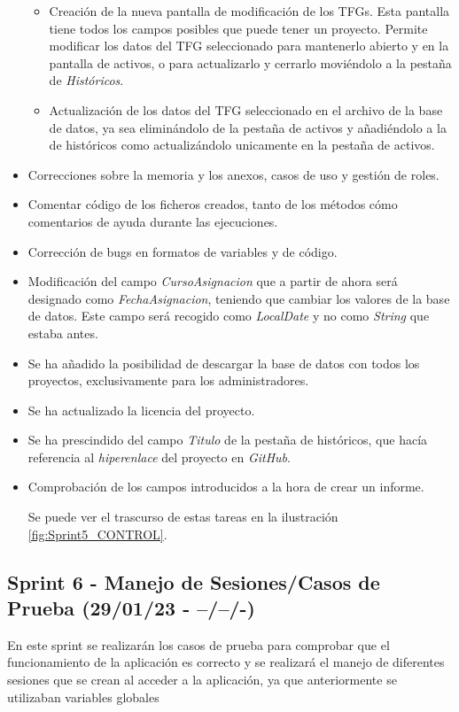 \begin{itemize}
\begin{itemize}
		\item Creación de la nueva pantalla de modificación de los TFGs. Esta pantalla tiene todos los campos posibles que puede tener un proyecto. Permite modificar los datos del TFG seleccionado para mantenerlo abierto y en la pantalla de activos, o para actualizarlo y cerrarlo moviéndolo a la pestaña de \emph{Históricos}.
		\item Actualización de los datos del TFG seleccionado en el archivo de la base de datos, ya sea eliminándolo de la pestaña de activos y añadiéndolo a la de históricos como actualizándolo unicamente en la pestaña de activos.
	\end{itemize}
	\item Correcciones sobre la memoria y los anexos, casos de uso y gestión de roles.
	\item Comentar código de los ficheros creados, tanto de los métodos cómo comentarios de ayuda durante las ejecuciones.
	\item Corrección de bugs en formatos de variables y de código.
	\item Modificación del campo \emph{CursoAsignacion} que a partir de ahora será designado como \emph{FechaAsignacion}, teniendo que cambiar los valores de la base de datos. Este campo será recogido como \emph{LocalDate} y no como \emph{String} que estaba antes.
	\item Se ha añadido la posibilidad de descargar la base de datos con todos los proyectos, exclusivamente para los administradores.
	\item Se ha actualizado la licencia del proyecto.
	\item Se ha prescindido del campo \emph{Titulo} de la pestaña de históricos, que hacía referencia al \emph{hiperenlace} del proyecto en  \emph{GitHub}.
	\item Comprobación de los campos introducidos a la hora de crear un informe. 
	
	Se puede ver el trascurso de estas tareas en la ilustración \ref{fig:Sprint5_CONTROL}.
	
\end{itemize}

\subsection{Sprint 6 - Manejo de Sesiones/Casos de Prueba (29/01/23 - --/--/-) }

En este sprint se realizarán los casos de prueba para comprobar que el funcionamiento de la aplicación es correcto y se realizará el manejo de diferentes sesiones que se crean al acceder a la aplicación, ya que anteriormente se utilizaban variables globales

